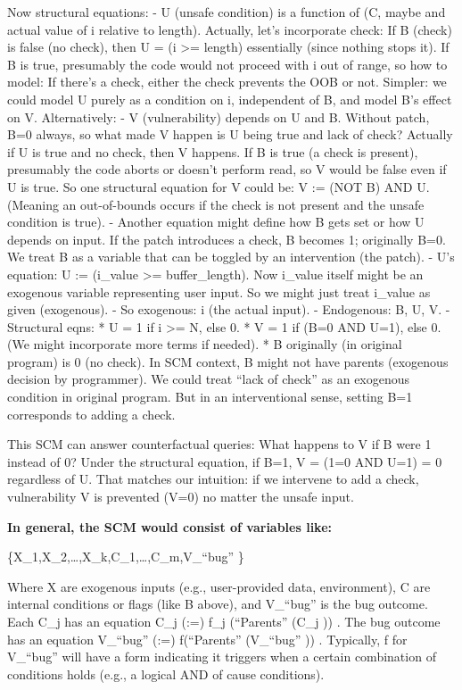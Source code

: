 \documentclass[conference,compsoc]{IEEEtran}
\begin{document}
Now structural equations: - U (unsafe condition) is a function of (C,
maybe and actual value of i relative to length). Actually, let's
incorporate check: If B (check) is false (no check), then U = (i
\textgreater= length) essentially (since nothing stops it). If B is
true, presumably the code would not proceed with i out of range, so how
to model: If there's a check, either the check prevents the OOB or not.
Simpler: we could model U purely as a condition on i, independent of B,
and model B's effect on V. Alternatively: - V (vulnerability) depends on
U and B. Without patch, B=0 always, so what made V happen is U being
true and lack of check? Actually if U is true and no check, then V
happens. If B is true (a check is present), presumably the code aborts
or doesn't perform read, so V would be false even if U is true. So one
structural equation for V could be: V := (NOT B) AND U. (Meaning an
out-of-bounds occurs if the check is not present and the unsafe
condition is true). - Another equation might define how B gets set or
how U depends on input. If the patch introduces a check, B becomes 1;
originally B=0. We treat B as a variable that can be toggled by an
intervention (the patch). - U's equation: U := (i\_value \textgreater=
buffer\_length). Now i\_value itself might be an exogenous variable
representing user input. So we might just treat i\_value as given
(exogenous). - So exogenous: i (the actual input). - Endogenous: B, U,
V. - Structural eqns: * U = 1 if i \textgreater= N, else 0. * V = 1 if
(B=0 AND U=1), else 0. (We might incorporate more terms if needed). * B
originally (in original program) is 0 (no check). In SCM context, B
might not have parents (exogenous decision by programmer). We could
treat ``lack of check'' as an exogenous condition in original program.
But in an interventional sense, setting B=1 corresponds to adding a
check.

This SCM can answer counterfactual queries: What happens to V if B were
1 instead of 0? Under the structural equation, if B=1, V = (1=0 AND U=1)
= 0 regardless of U. That matches our intuition: if we intervene to add
a check, vulnerability V is prevented (V=0) no matter the unsafe input.

\textbf{In general, the SCM would consist of variables like:}

\{X\_1,X\_2,\ldots,X\_k,C\_1,\ldots,C\_m,V\_``bug'' \}

Where X are exogenous inputs (e.g., user-provided data, environment), C
are internal conditions or flags (like B above), and V\_``bug'' is the
bug outcome. Each C\_j has an equation C\_j \square (:=) f\_j (``Parents''
(C\_j )) . The bug outcome has an equation V\_``bug'' \square (:=)
f(``Parents'' (V\_``bug'' )) . Typically, f for V\_``bug'' will have a
form indicating it triggers when a certain combination of conditions
holds (e.g., a logical AND of cause conditions).
\end{document}
